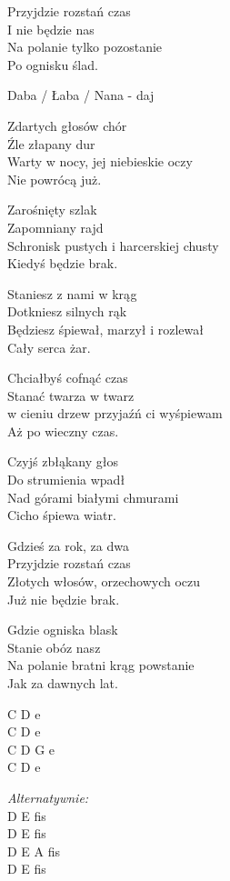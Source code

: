 \begin{text}
    Przyjdzie rozstań czas\\
    I nie będzie nas\\
    Na polanie tylko pozostanie\\
    Po ognisku ślad.

    \vin Daba / Łaba / Nana - daj 

    Zdartych głosów chór\\
    Źle złapany dur\\
    Warty w nocy, jej niebieskie oczy\\
    Nie powrócą już.

    Zarośnięty szlak\\
    Zapomniany rajd\\
    Schronisk pustych i harcerskiej chusty\\
    Kiedyś będzie brak.

    Staniesz z nami w krąg\\
    Dotkniesz silnych rąk\\
    Będziesz śpiewał, marzył i rozlewał\\
    Cały serca żar.

    Chciałbyś cofnąć czas\\
    Stanać twarza w twarz\\
    w cieniu drzew przyjaźń ci wyśpiewam\\
    Aż po wieczny czas.

    Czyjś zbłąkany głos\\
    Do strumienia wpadł\\
    Nad górami białymi chmurami\\
    Cicho śpiewa wiatr.

    Gdzieś za rok, za dwa\\
    Przyjdzie rozstań czas\\
    Złotych włosów, orzechowych oczu\\
    Już nie będzie brak.

    Gdzie ogniska blask\\
    Stanie obóz nasz\\
    Na polanie bratni krąg powstanie\\
    Jak za dawnych lat.

\end{text}
\begin{chord}
    C D e\\
    C D e\\
    C D G e\\
    C D e
	
\hfill\break
    \textit{Alternatywnie:}\\
    D E fis\\
	D E fis\\
	D E A fis\\
	D E fis
\end{chord}